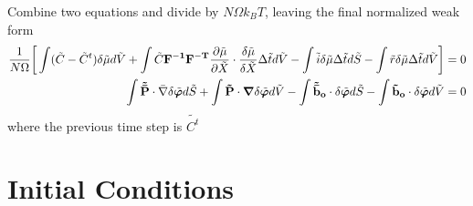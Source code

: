 \documentclass[12pt,3p]{article}
\numberwithin{equation}{section}
\begin{document}
Combine two equations and divide by $N \Omega k_B T$, leaving the final normalized weak form 
\begin{align*}
\frac{1}{N \Omega} \bigg[ \int (\tilde{C} - \tilde{C}^t) \delta \tilde{\mu} d\tilde{V} + \int \tilde{C} \mathbf{F^{-1}} \mathbf{F^{-T}} \pdv{ \tilde{\mu} }{\tilde{X}} \cdot \frac{\delta \tilde{\mu}}{\delta \tilde{X}} \Delta \tilde{t} d\tilde{V} - \int \tilde{i} \delta \tilde{\mu} \Delta \tilde{t} d\tilde{S} - \int \tilde{r} \delta \tilde{\mu}  \Delta \tilde{t} d \tilde{V} \bigg] &= 0 \\
\int \mathbf{\tilde{\bar{P}}} \cdot \bar{\nabla} \delta \tilde{\boldsymbol\varphi} d\tilde{S} + \int \mathbf{\tilde{P}}  \cdot \grad \delta \tilde{\boldsymbol\varphi} d\tilde{V} - \int \mathbf{\tilde{\bar{b}}_o} \cdot \delta \tilde{\boldsymbol\varphi} d \tilde{S} - \int \mathbf{\tilde{b}_o} \cdot \delta \tilde{\boldsymbol\varphi} d\tilde{V} &= 0
\end{align*}
where the previous time step is $\tilde{C^t}$

\section{Initial Conditions}

\end{document}

